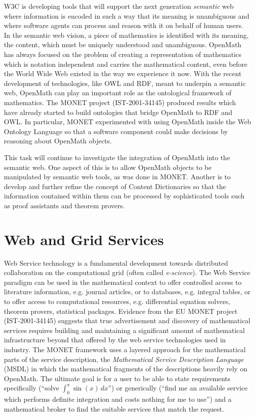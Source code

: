 \documentclass{euproposal}
\begin{document}
W3C is developing tools that will support the next generation
\emph{semantic} web where information is encoded in such a way that
its meaning is unambiguous and where software agents can process and
reason with it on behalf of human users.  In the semantic web vision,
a piece of mathematics is identified with its meaning, the content,
which must be uniquely understood and unambiguous.  OpenMath has
always focused on the problem of creating a representation of
mathematics which is notation independent and carries the mathematical
content, even before the World Wide Web existed in the way we
experience it now. With the recent development of technologies, like
OWL and RDF, meant to underpin a semantic web, OpenMath can play an
important role as the ontological framework of mathematics. The MONET
project (IST-2001-34145) produced results which have already started
to build ontologies that bridge OpenMath to RDF and OWL.  In
particular, MONET experimented with using OpenMath inside the Web
Ontology Language so that a software component could make decisions by
reasoning about OpenMath objects.

This task will continue to investigate the integration of OpenMath
into the semantic web.  One aspect of this is to allow OpenMath
objects to be manipulated by semantic web tools, as was done in MONET.
Another is to develop and further refine the concept of Content
Dictionaries so that the information contained within them can be
processed by sophisticated tools such as proof assistants and theorem
provers.

\section{Web and Grid Services}



Web Service technology is a fundamental development towards
distributed collaboration on the computational grid (often called
\emph{e-science}).  The Web Service paradigm can be used in the
mathematical context to offer controlled access to literature
information, e.g. journal articles, or to databases, e.g.  integral
tables, or to offer access to computational resources, e.g.
differential equation solvers, theorem provers, statistical packages.
Evidence from the EU MONET project (IST-2001-34145) suggests that true
advertisement and discovery of mathematical services requires building
and maintaining a significant amount of mathematical infrastructure
beyond that offered by the web service technologies used in industry.
The MONET framework uses a layered approach for the mathematical parts
of the service description, the \emph{Mathematical Service Description
  Language} (MSDL) in which the mathematical fragments of the
descriptions heavily rely on OpenMath.  The ultimate goal is for a
user to be able to state requirements specifically (``solve
$\int_0^\pi{}\sin(x)\,dx$'') or generically (``find me an available
service which performs definite integration and costs nothing for me
to use'') and a mathematical broker to find the suitable services that
match the request.
\end{document}
